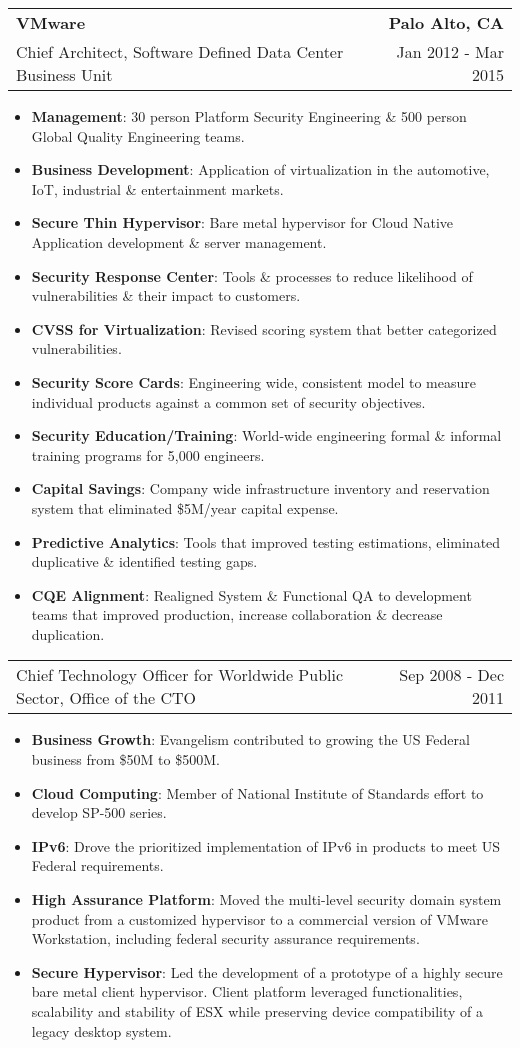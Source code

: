 \documentclass[letterpaper,11pt]{article}
\makeatletter
\newcommand{\resumeCompanyHeading}[4]{
  \vspace{-1pt}
    \item
    \begin{tabular*}{1.0\textwidth}[t]{l@{\extracolsep{\fill}}r}
      \textbf{#1} & \textbf{#2} \\
      {#3} & {#4}
    \end{tabular*}\vspace{-10pt}
  }
\newcommand{\resumeCompanyPositionHeading}[2]{
      \item
      \begin{tabular*}{1.0\textwidth}{l@{\extracolsep{\fill}}r}
        {#1} & {#2}
    \end{tabular*}\vspace{-10pt}
}
\newcommand{\resumeItem}[2]{\item{{\textbf{\small#1}}: {\small#2 \vspace{-1pt}}}}
\newcommand{\resumeItemListStart}{\begin{itemize}}
\newcommand{\resumeItemListEnd}{\end{itemize}}\vspace{-10pt}
\makeatother
\begin{document}
        \resumeCompanyHeading
            {VMware}
            {Palo Alto, CA}
            {Chief Architect, Software Defined Data Center Business Unit}
            {Jan 2012 - Mar 2015}
            \resumeItemListStart
                \resumeItem{Management}{30 person Platform Security Engineering \& 500 person Global Quality Engineering teams.}
                \resumeItem{Business Development}{Application of virtualization in the automotive, IoT, industrial \& entertainment markets.}
                \resumeItem{Secure Thin Hypervisor}{Bare metal hypervisor for Cloud Native Application development \& server management.}
                \resumeItem{Security Response Center}{Tools \& processes to reduce likelihood of vulnerabilities \& their impact to customers.}
                \resumeItem{CVSS for Virtualization}{Revised scoring system that better categorized vulnerabilities.}
                \resumeItem{Security Score Cards}{Engineering wide, consistent model to measure individual products against a common set of security objectives.}
                \resumeItem{Security Education/Training}{World-wide engineering formal \& informal training programs for 5,000 engineers.}
                \resumeItem{Capital Savings}{Company wide infrastructure inventory and reservation system that eliminated \$5M/year capital expense.}
                \resumeItem{Predictive Analytics}{Tools that improved testing estimations, eliminated duplicative \& identified testing gaps.}
                \resumeItem{CQE Alignment}{Realigned System \& Functional QA to development teams that improved production, increase collaboration \& decrease duplication.}
            \resumeItemListEnd
  
          \resumeCompanyPositionHeading
            {Chief Technology Officer for Worldwide Public Sector, Office of the CTO}
            {Sep 2008 - Dec 2011}
            \resumeItemListStart
                \resumeItem{Business Growth}{Evangelism contributed to growing the US Federal business from \$50M to \$500M.}
                \resumeItem{Cloud Computing}{Member of National Institute of Standards effort to develop SP-500 series.}
                \resumeItem{IPv6}{Drove the prioritized implementation of IPv6 in products to meet US Federal requirements.}
                \resumeItem{High Assurance Platform}{Moved the multi-level security domain system product from a customized hypervisor to a 
                  commercial version of VMware Workstation, including federal security assurance requirements.}
                \resumeItem{Secure Hypervisor}{Led the development of a prototype of a highly secure bare metal client hypervisor. Client platform leveraged
                  functionalities, scalability and stability of ESX while preserving device compatibility of a legacy desktop system.}
            \resumeItemListEnd
  
\end{document}
